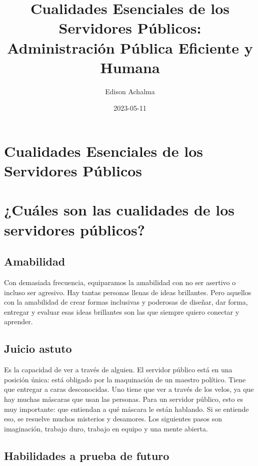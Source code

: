 \documentclass[
  jou,
  floatsintext,
  longtable,
  a4paper,
  nolmodern,
  notxfonts,
  notimes,
  colorlinks=true,linkcolor=blue,citecolor=blue,urlcolor=blue]{apa7}
\title{Cualidades Esenciales de los Servidores Públicos: Administración
Pública Eficiente y Humana}
\author{Edison Achalma}
\affiliation{
{Departamento de Economía, Universidad Nacional de San Cristóbal de
Huamanga}}
\date{2023-05-11}
\begin{document}
\maketitle

\hypertarget{toc}{}
\tableofcontents
\newpage
\section[Introduction]{Cualidades Esenciales de los Servidores Públicos}

\setcounter{secnumdepth}{-\maxdimen} %

\setlength\LTleft{0pt}


\section{¿Cuáles son las cualidades de los servidores
públicos?}\label{cuuxe1les-son-las-cualidades-de-los-servidores-puxfablicos}

\subsection{Amabilidad}\label{amabilidad}

Con demasiada frecuencia, equiparamos la amabilidad con no ser asertivo
o incluso ser agresivo. Hay tantas personas llenas de ideas brillantes.
Pero aquellos con la amabilidad de crear formas inclusivas y poderosas
de diseñar, dar forma, entregar y evaluar esas ideas brillantes son las
que siempre quiero conectar y aprender.

\subsection{Juicio astuto}\label{juicio-astuto}

Es la capacidad de ver a través de alguien. El servidor público está en
una posición única: está obligado por la maquinación de un maestro
político. Tiene que entregar a caras desconocidas. Uno tiene que ver a
través de los velos, ya que hay muchas máscaras que usan las personas.
Para un servidor público, esto es muy importante: que entiendan a qué
máscara le están hablando. Si se entiende eso, se resuelve muchos
misterios y desamores. Los siguientes pasos son imaginación, trabajo
duro, trabajo en equipo y una mente abierta.

\subsection{Habilidades a prueba de
futuro}\label{habilidades-a-prueba-de-futuro}
\end{document}
